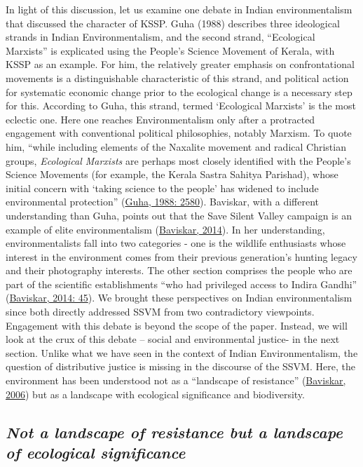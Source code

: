 \documentclass[twoside, 13pt]{article}
\begin{document}
{{{{In light of this discussion, let us examine one debate in Indian environmentalism that discussed the character of KSSP. Guha (1988) describes three ideological strands in Indian Environmentalism, and the second strand, “Ecological Marxists” is explicated using the People’s Science Movement of Kerala, with KSSP as an example. For him, the relatively greater emphasis on confrontational movements is a distinguishable characteristic of this strand, and political action for systematic economic change prior to the ecological change is a necessary step for this. According to Guha, this strand, termed ‘Ecological Marxists’ is the most eclectic one. Here one reaches Environmentalism only after a protracted engagement with conventional political philosophies, notably Marxism. To quote him, “while including elements of the Naxalite movement and radical Christian groups, \textit{Ecological Marxists} are perhaps most closely identified with the People’s Science Movements (for example, the Kerala Sastra Sahitya Parishad), whose initial concern with ‘taking science to the people’ has widened to include environmental protection” (\underline{Guha, 1988: 2580}). Baviskar, with a different understanding than Guha, points out that the Save Silent Valley campaign is an example of elite environmentalism (\underline{Baviskar, 2014}). In her understanding, environmentalists fall into two categories - one is the wildlife enthusiasts whose interest in the environment comes from their previous generation’s hunting legacy and their photography interests. The other section comprises the people who are part of the scientific establishments “who had privileged access to Indira Gandhi” (\underline{Baviskar, 2014: 45}). We brought these perspectives on Indian environmentalism since both directly addressed SSVM from two contradictory viewpoints. Engagement with this debate is beyond the scope of the paper. Instead, we will look at the crux of this debate – social and environmental justice- in the next section.
Unlike what we have seen in the context of Indian Environmentalism, the question of distributive justice is missing in the discourse of the SSVM. Here, the environment has been understood not as a “landscape of resistance” (\underline{Baviskar, 2006}) but as a landscape with ecological significance and biodiversity.}

\vspace{-.2cm}

{\fontsize{8}{10}\selectfont\subsection*{\textit{Not a landscape of resistance but a landscape of ecological significance}}}


}}}
\end{document}
